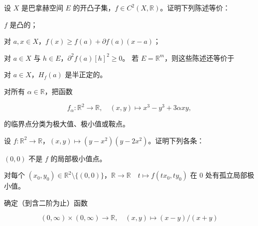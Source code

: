 \begin{exercises}
\item

设 $ X $ 是巴拿赫空间 $ E $ 的开凸子集，$ f \in C^{2}(X, \mathbb{R}) $。证明下列陈述等价：

\begin{subitems}
\item

$ f $ 是凸的；

\item

对 $ a, x \in X $，$ f(x) \ge f(a) + \partial f(a)(x - a) $；

\item

对 $ a \in X $ 与 $ h \in E $，$ \partial^{2}f(a)[h]^{2} \ge 0 $。
若 $ E = \mathbb{R}^{m} $，则这些陈述还等价于

\item

对 $ a \in X $，$ H_{f}(a) $ 是半正定的。

\end{subitems}

\item

对所有 $ \alpha \in \mathbb{R} $，把函数

\[
f_{\alpha} : \mathbb{R}^{2} \to \mathbb{R} , \quad (x, y) \mapsto x^{3} - y^{3} + 3\alpha xy ,
\]

的临界点分类为极大值、极小值或鞍点。

\item

设 $ f : \mathbb{R}^{2} \to \mathbb{R} $，$ (x, y) \mapsto (y - x^{2})(y - 2x^{2}) $。证明下列各条：

\begin{items}
\item

$ (0, 0) $ 不是 $ f $ 的局部极小值点。

\item

对每个 $ (x_{0}, y_{0}) \in \mathbb{R}^{2} \setminus \{(0, 0)\} $，$ \mathbb{R} \to \mathbb{R} \quad t \mapsto f(tx_{0}, ty_{0}) $ 在 $ 0 $ 处有孤立局部极小值。

\end{items}

\item

确定（到含二阶为止）函数

\[
(0, \infty) \times (0, \infty) \to \mathbb{R} , \quad (x, y) \mapsto (x - y)/(x + y)
\]


\end{exercises}
